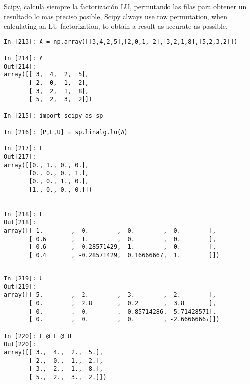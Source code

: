 \begin{paracol}{2}
 Scipy, calcula siempre la factorización LU, permutando las filas para obtener un resultado lo mas preciso posible,
 \switchcolumn
 Scipy always use row permutation, when calculating an LU factorization, to obtain a result as accurate as possible,   
\end{paracol}

\begin{center}	
\begin{minipage}{0.7\textwidth}
\begin{verbatim}
In [213]: A = np.array([[3,4,2,5],[2,0,1,-2],[3,2,1,8],[5,2,3,2]])

In [214]: A
Out[214]: 
array([[ 3,  4,  2,  5],
       [ 2,  0,  1, -2],
       [ 3,  2,  1,  8],
       [ 5,  2,  3,  2]])

In [215]: import scipy as sp

In [216]: [P,L,U] = sp.linalg.lu(A)

In [217]: P
Out[217]: 
array([[0., 1., 0., 0.],
       [0., 0., 0., 1.],
       [0., 0., 1., 0.],
       [1., 0., 0., 0.]])


In [218]: L
Out[218]: 
array([[ 1.        ,  0.        ,  0.        ,  0.        ],
       [ 0.6       ,  1.        ,  0.        ,  0.        ],
       [ 0.6       ,  0.28571429,  1.        ,  0.        ],
       [ 0.4       , -0.28571429,  0.16666667,  1.        ]])
\end{verbatim}
\end{minipage}
\end{center}

\begin{center}
\begin{minipage}{0.7\textwidth}
\begin{verbatim}

In [219]: U
Out[219]: 
array([[ 5.        ,  2.        ,  3.        ,  2.        ],
       [ 0.        ,  2.8       ,  0.2       ,  3.8       ],
       [ 0.        ,  0.        , -0.85714286,  5.71428571],
       [ 0.        ,  0.        ,  0.        , -2.66666667]])

In [220]: P @ L @ U
Out[220]: 
array([[ 3.,  4.,  2.,  5.],
       [ 2.,  0.,  1., -2.],
       [ 3.,  2.,  1.,  8.],
       [ 5.,  2.,  3.,  2.]])
\end{verbatim}
\end{minipage}
\end{center}


